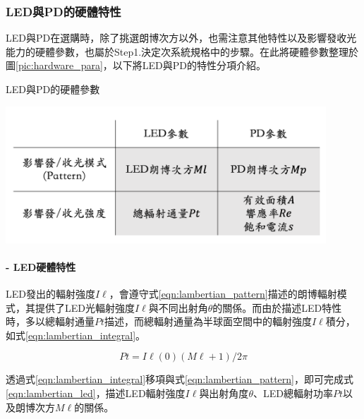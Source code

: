     \subsubsection{LED與PD的硬體特性}
            \label{chp:LEDPD_hardware}

            LED與PD在選購時，除了挑選朗博次方以外，也需注意其他特性以及影響發收光能力的硬體參數，也屬於Step1.決定次系統規格中的步驟。在此將硬體參數整理於圖\ref{pic:hardware_para}，以下將LED與PD的特性分項介紹。
            
            \begin{table}[htpb]
                \centering
                \caption{LED與PD的硬體參數}
                \label{pic:hardware_para}
                \includegraphics[width=12cm]{ch2pic/hardware_para.png}                
            \end{table}

            \paragraph*{- LED硬體特性}

            \hfill

                LED發出的輻射強度$I\ell$，會遵守式\ref{eqn:lambertian_pattern}描述的朗博輻射模式，其提供了LED光輻射強度$I\ell$與不同出射角$\theta$的關係。而由於描述LED特性時，多以總輻射通量$Pt$描述，而總輻射通量為半球面空間中的輻射強度$I\ell$積分，如式\ref{eqn:lambertian_integral}。

                \begin{equation}
                    \label{eqn:lambertian_integral}
                    Pt = I\ell(0)(M\ell+1)/2\pi
                \end{equation}
                
                透過式\ref{eqn:lambertian_integral}移項與式\ref{eqn:lambertian_pattern}，即可完成式\ref{eqn:lambertian_led}，描述LED輻射強度$I\ell$與出射角度$\theta$、LED總輻射功率$Pt$以及朗博次方$M\ell$的關係。
            
